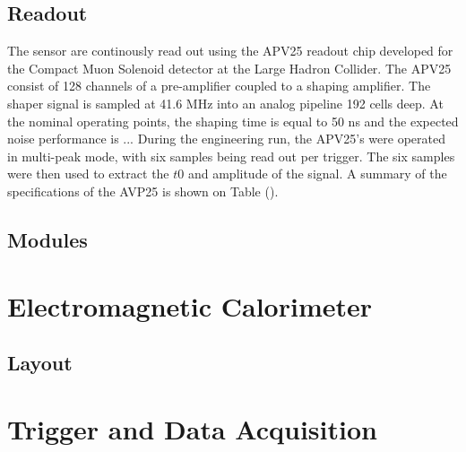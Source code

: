 \subsection*{Readout}

The sensor are continously read out using the APV25 readout chip developed for
the Compact Muon Solenoid detector at the Large Hadron Collider.  The APV25
consist of 128 channels of a pre-amplifier coupled to a shaping amplifier. The
shaper signal is sampled at 41.6 MHz into an analog pipeline 192 cells deep.
At the nominal operating points, the shaping time is equal to 50 ns and the
expected noise performance is ...  During the engineering run, the APV25's
were operated in multi-peak mode, with six samples being read out per 
trigger.  The six samples were then used to extract the $t0$ and amplitude 
of the signal.  A summary of the specifications of the AVP25 is shown
on Table ().

\subsection*{Modules}

\section{Electromagnetic Calorimeter}

\subsection{Layout}

\section{Trigger and Data Acquisition}

